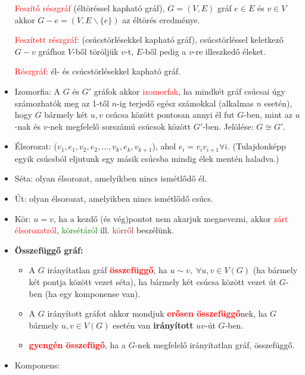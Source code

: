 \documentclass[../../szobeli.tex]{subfiles}
\begin{document}
\begin{itemize}
        \textcolor{red}{Feszítő részgráf} (éltöréssel kapható gráf), $G=(V,E)$ gráf $e \in E$ és $v \in V$ akkor $G-e=(V,E \backslash \{e\})$ az éltörés eredménye. 
        
        \textcolor{red}{Feszített részgráf}: (csúcstörlésekkel kapható gráf), csúcstörléssel keletkező $G-v$ gráfhoz $V$-ből töröljük $v$-t, $E$-ből pedig a $v$-re illeszkedő éleket. 
        
        \textcolor{red}{Részgráf}: él- és csúcstörlésekkel kapható gráf. 

        \item Izomorfia: A $G$ és $G'$ gráfok akkor \textcolor{red}{izomorfak}, ha mindkét gráf csúcsai úgy számozhatók meg az 1-től $n$-ig terjedő egész számokkal (alkalmas $n$ esetén), hogy $G$ bármely két $u,v$ csúcsa között pontosan annyi él fut $G$-ben, mint az $u$-nak és $v$-nek megfelelő sorszámú csúcsok között $G'$-ben. Jelölése: $G \cong G'$.
        \item Élsorozat: ($v_1,e_1,v_2,e_2,\dots,v_k,e_k,v_{k+1}$), ahol $e_i=v_i v_{i+1}\forall i$. (Tulajdonképp egyik csúcsból eljutunk egy másik csúcsba mindig élek mentén haladva.)
        \item Séta: olyan élsorozat, amelyikben nincs ismétlődő él. 	
        \item Út: olyan élsorozat, amelyikben nincs ismétlődő csúcs.
        \item Kör: $u = v$, ha a kezdő (és vég)pontot nem akarjuk megnevezni, akkor \textcolor{red}{zárt élsorozatról}, \textcolor{green}{körsétáról} ill. \textcolor{brown}{körről} beszélünk.
        \item \textbf{Összefüggő gráf:} \begin{itemize}
            \item A $G$ irányítatlan gráf \textcolor{red}{\textbf{összefüggő}}, ha $u \sim v, \;\forall u,v \in V(G)$ (ha bármely két pontja között vezet séta), ha bármely két csúcsa között vezet út $G$-ben (ha egy komponense van).
            \item A $G$ irányított gráfot akkor mondjuk \textcolor{red}{\textbf{erősen összefüggő}}nek, ha $G$ bármely $u,v \in V(G) $ esetén van \textbf{irányított} $uv$-út $G$-ben.
            \item \textcolor{red}{\textbf{gyengén összefügő}}, ha a $G$-nek megfelelő irányítatlan gráf, összefüggő.
        \end{itemize}
        \item Komponens: \begin{itemize}

\end{itemize}
\end{itemize}
\end{document}
